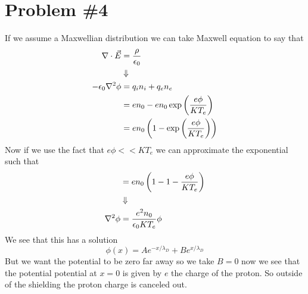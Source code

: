 \documentclass[11pt]{article}
\numberwithin{equation}{section}
\begin{document}
\section{Problem \#4}
If we assume a Maxwellian distribution we can take Maxwell equation to say that
\begin{align*}
\bold\nabla\cdot\vec{E} &= \frac{\rho}{\epsilon_0}\\
&\Downarrow\\
-\epsilon_0\bold\nabla^2\phi &= q_in_i + q_en_e\\
&= en_0 - en_0\exp\left(\frac{e\phi}{KT_e}\right)\\
&= en_0\left(1 - \exp\left(\frac{e\phi}{KT_e}\right)\right)
\end{align*}
Now if we use the fact that $e\phi<<KT_e$ we can approximate the exponential such that
\begin{align*}
&= en_0\left(1 - 1 - \frac{e\phi}{KT_e}\right)\\
&\Downarrow\\
\bold\nabla^2\phi &= \frac{e^2n_0}{\epsilon_0KT_e}\phi
\end{align*}
We see that this has a solution 
$$\phi(x) = Ae^{-x/\lambda_D}+Be^{x/\lambda_D}$$
But we want the potential to be zero far away so we take $B=0$ now we see that the potential potential at $x=0$ is given by $e$ the charge of the proton. So outside of the shielding the proton charge is canceled out.
\end{document}
